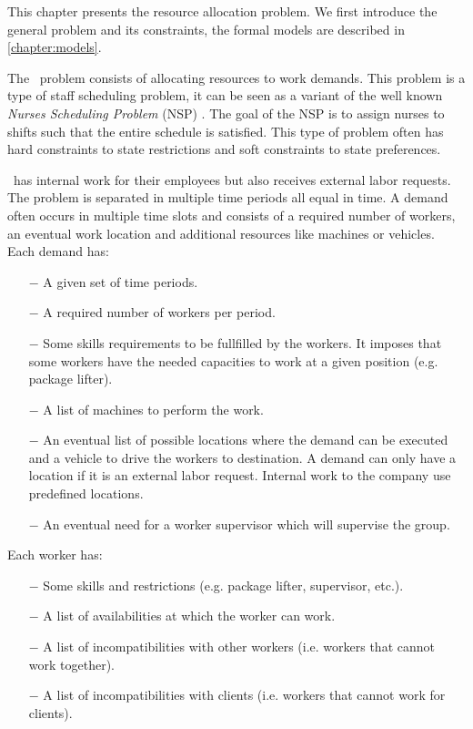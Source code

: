 \documentclass[../thesis.tex]{subfiles}
\begin{document}
This chapter presents the resource allocation problem.
We first introduce the general problem and its constraints, 
the formal models are described in \autoref{chapter:models}.

The \vone\ problem consists of allocating resources to work demands.
This problem is a type of staff scheduling problem, it can be seen as a variant of the 
well known \emph{Nurses Scheduling Problem} (NSP) \cite{Burke2004}. The goal of the NSP is to assign 
nurses to shifts such that the entire schedule is satisfied. 
This type of problem often has hard constraints to state restrictions 
and soft constraints to state preferences. 

\vone\ has internal work for their employees but also receives 
external labor requests. The problem is separated in multiple time periods all equal in time.
A demand often occurs in multiple time slots and consists of a required number of workers, an eventual 
work location and additional resources like machines or vehicles. Each demand has:

\begin{itemize}
  \item[$-$] A given set of time periods.
  \item[$-$] A required number of workers per period.
  \item[$-$] Some skills requirements to be fullfilled by the workers. 
  It imposes that some workers have the needed capacities to work at a given position (e.g. package lifter).
  \item[$-$] A list of machines to perform the work.
  \item[$-$] An eventual list of possible locations where the demand can be executed and a vehicle to drive the workers to destination.
  A demand can only have a location if it is an external labor request. Internal work to the company use predefined locations.
  \item[$-$] An eventual need for a worker supervisor which will supervise the group.
\end{itemize}


Each worker has:

\begin{itemize}
  \item[$-$] Some skills and restrictions (e.g. package lifter, supervisor, etc.).
  \item[$-$] A list of availabilities at which the worker can work.
  \item[$-$] A list of incompatibilities with other workers (i.e. workers that cannot work together).
  \item[$-$] A list of incompatibilities with clients (i.e. workers that cannot work for clients).
\end{itemize}
\end{document}
